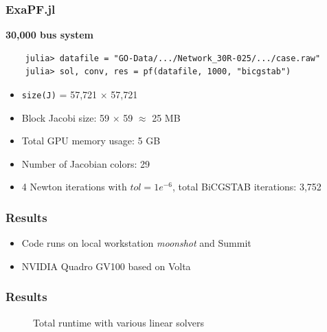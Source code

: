 \begin{frame}
\begin{frame}[fragile]
  \frametitle{ExaPF.jl}
  {\bf 30,000 bus system}
  \begin{lstlisting}
    julia> datafile = "GO-Data/.../Network_30R-025/.../case.raw"
    julia> sol, conv, res = pf(datafile, 1000, "bicgstab")
  \end{lstlisting}
  \begin{itemize}
    \item \lstinline{size(J)} = 57,721 $\times$ 57,721 
    \item Block Jacobi size: 59 $\times$ 59 $\approx$ 25 MB
    \item Total GPU memory usage: 5 GB
    \item Number of Jacobian colors: 29
    \item 4 Newton iterations with $tol = 1e^{-6}$, total BiCGSTAB iterations: 3,752 
  \end{itemize}
\end{frame}

\begin{frame}
  \frametitle{Results}
  \begin{itemize}
    \item Code runs on local workstation {\it moonshot} and Summit
    \item NVIDIA Quadro GV100 based on Volta 
  \end{itemize}
\end{frame}

\begin{frame}[fragile]
  \frametitle{Results}
  \begin{figure}
\caption{Total runtime with various linear solvers}
\label{fig:totalruntime}
\end{figure}
\end{frame}



\end{frame}
